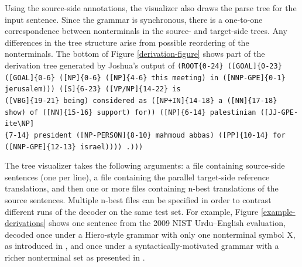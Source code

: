 \documentclass[nologo]{pbml}
\begin{document}
Using the source-side annotations, the visualizer also draws the 
parse tree for the input sentence. Since the grammar is synchronous, there is
a one-to-one correspondence between nonterminals in the source- and target-side
trees. Any differences in the tree structure arise from possible reordering
of the nonterminals.
The bottom of Figure \ref{derivation-figure} shows part of the derivation tree 
generated by Joshua's output of 
{\tt (ROOT\{0-24\} ([GOAL]\{0-23\} ([GOAL]\{0-6\} ([NP]\{0-6\} ([NP]\{4-6\} this meeting) in ([NNP-GPE]\{0-1\} jerusalem))) ([S]\{6-23\} ([VP/NP]\{14-22\} is 
 \\
 ([VBG]\{19-21\} being) considered as ([NP+IN]\{14-18\} a ([NN]\{17-18\} show) of ([NN]\{15-16\} support) for)) ([NP]\{6-14\} palestinian ([JJ-GPE-ite\textbackslash NP]
 \\
\{7-14\} president ([NP-PERSON]\{8-10\} mahmoud abbas) ([PP]\{10-14\} for 
 \\
 ([NNP-GPE]\{12-13\} israel)))) .)))}


The tree visualizer takes the following arguments:  a file containing source-side sentences (one per line), a file containing the parallel target-side reference translations, and then one or more files containing n-best translations of the source sentences.
Multiple n-best files can be specified in order to contrast different runs
of the decoder on the same test set. For example, Figure \ref{example-derivations} shows one
sentence from the 2009 NIST Urdu--English evaluation, decoded once under a 
Hiero-style grammar with only one nonterminal symbol X, as introduced in
\cite{Chiang2005}, and once under a
syntactically-motivated grammar with a richer nonterminal set as  presented in \cite{samt2006}.
\end{document}
